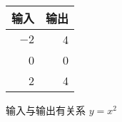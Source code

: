 \begin{tabular}{|rr|}
\hline
  输入 & 输出 \\ \hline
  $-2$ & 4 \\
  0 & 0 \\
  2 & 4 \\
\hline
\end{tabular}
\qquad
输入与输出有关系 $y = x^2$
